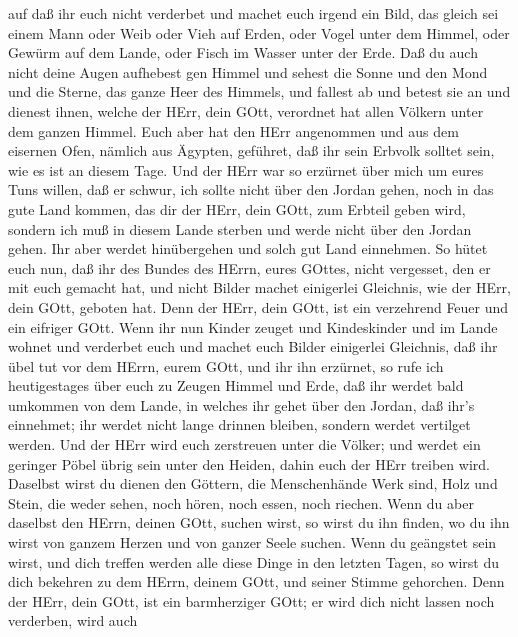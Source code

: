  auf daß ihr euch nicht verderbet und machet euch irgend
ein Bild, das gleich sei einem Mann oder Weib  oder Vieh
auf Erden, oder Vogel unter dem Himmel,  oder Gewürm auf
dem Lande, oder Fisch im Wasser unter der Erde.  Daß du
auch nicht deine Augen aufhebest gen Himmel und sehest die Sonne und den
Mond und die Sterne, das ganze Heer des Himmels, und fallest ab und
betest sie an und dienest ihnen, welche der HErr, dein GOtt, verordnet
hat allen Völkern unter dem ganzen Himmel.  Euch aber hat
den HErr angenommen und aus dem eisernen Ofen, nämlich aus Ägypten,
geführet, daß ihr sein Erbvolk solltet sein, wie es ist an diesem Tage.
 Und der HErr war so erzürnet über mich um eures Tuns
willen, daß er schwur, ich sollte nicht über den Jordan gehen, noch in
das gute Land kommen, das dir der HErr, dein GOtt, zum Erbteil geben
wird,  sondern ich muß in diesem Lande sterben und werde
nicht über den Jordan gehen. Ihr aber werdet hinübergehen und solch gut
Land einnehmen.  So hütet euch nun, daß ihr des Bundes des
HErrn, eures GOttes, nicht vergesset, den er mit euch gemacht hat, und
nicht Bilder machet einigerlei Gleichnis, wie der HErr, dein GOtt,
geboten hat.  Denn der HErr, dein GOtt, ist ein verzehrend
Feuer und ein eifriger GOtt.  Wenn ihr nun Kinder zeuget
und Kindeskinder und im Lande wohnet und verderbet euch und machet euch
Bilder einigerlei Gleichnis, daß ihr übel tut vor dem HErrn, eurem GOtt,
und ihr ihn erzürnet,  so rufe ich heutigestages über euch
zu Zeugen Himmel und Erde, daß ihr werdet bald umkommen von dem Lande,
in welches ihr gehet über den Jordan, daß ihr's einnehmet; ihr werdet
nicht lange drinnen bleiben, sondern werdet vertilget werden.
 Und der HErr wird euch zerstreuen unter die Völker; und
werdet ein geringer Pöbel übrig sein unter den Heiden, dahin euch der
HErr treiben wird.  Daselbst wirst du dienen den Göttern,
die Menschenhände Werk sind, Holz und Stein, die weder sehen, noch
hören, noch essen, noch riechen.  Wenn du aber daselbst den
HErrn, deinen GOtt, suchen wirst, so wirst du ihn finden, wo du ihn
wirst von ganzem Herzen und von ganzer Seele suchen.  Wenn
du geängstet sein wirst, und dich treffen werden alle diese Dinge in den
letzten Tagen, so wirst du dich bekehren zu dem HErrn, deinem GOtt, und
seiner Stimme gehorchen.  Denn der HErr, dein GOtt, ist ein
barmherziger GOtt; er wird dich nicht lassen noch verderben, wird auch
